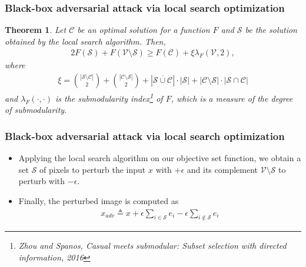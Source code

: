 \documentclass[10pt,mathserif]{beamer}
\newtheorem{thm}{Theorem}
\begin{document}
\begin{frame}
\frametitle{Black-box adversarial attack via local search optimization}
\begin{thm}
Let $\mathcal{C}$ be an optimal solution for a function $F$ and $\mathcal{S}$ be the solution obtained by the local search algorithm. Then,
\begin{align*}
    2F(\mathcal{S})+F(\mathcal{V} \setminus \mathcal{S}) \ge  F(\mathcal{C}) + \xi \lambda_F(\mathcal{V}, 2),
\end{align*}
where 
\small
\begin{align*}
    \xi = \binom{|\mathcal{S} \setminus \mathcal{C}|}{2} + \binom{|\mathcal{C} \setminus \mathcal{S}|}{2} + |\overline{\mathcal{S} \cup \mathcal{C}}| \cdot |\mathcal{S}| + |\mathcal{C} \setminus \mathcal{S}| \cdot |\mathcal{S} \cap \mathcal{C}|
\end{align*}
\normalsize
and $\lambda_{F}(\cdot,\cdot)$ is the submodularity index\footnote{\scriptsize Zhou and Spanos, \textit{Casual meets submodular: Subset selection with directed information, 2016}} of $F$, which is a measure of the degree of submodularity.
\end{thm}
\end{frame}

\begin{frame}
\frametitle{Black-box adversarial attack via local search optimization}
\begin{itemize}\itemsep=12pt
\item Applying the local search algorithm on our objective set function, we obtain a set $\mathcal{S}$ of pixels to perturb the input $x$ with $+\epsilon$ and its complement $\mathcal{V} \setminus \mathcal{S}$ to perturb with $-\epsilon$.\pause
\item Finally, the perturbed image is computed as
\begin{align*}
x_{adv} \triangleq x + \epsilon \sum_{i \in \mathcal{S}}e_i - \epsilon \sum_{i \notin \mathcal{S}}e_i
\end{align*}
\end{itemize}
\end{frame}
\end{document}
